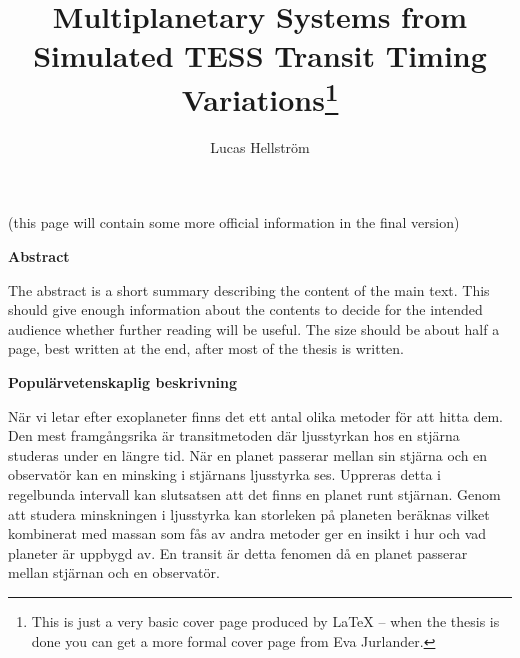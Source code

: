 \documentclass[12pt]{report}
\begin{document}
\title{\huge \bf Multiplanetary Systems from Simulated TESS Transit Timing Variations\footnote{This is just a very basic cover page produced by LaTeX -- when
the thesis is done you can get a more formal cover page from Eva Jurlander.}}
\author{Lucas Hellström}

\thispagestyle{empty} %

\maketitle

\newpage

\thispagestyle{empty}

\begin{center}
  (this page will contain some more official information in the final version)
\end{center}

\newpage

\thispagestyle{empty}

\begin{center}
  {\bf Abstract}
\end{center}
The abstract is a short summary describing the content of the main text. This
should give enough information about the contents to decide for the intended
audience whether further reading will be useful. The size should be about half
a page, best written at the end, after most of the thesis is written.

\newpage

\thispagestyle{empty}
\mbox{} %

\newpage

\thispagestyle{empty}

\begin{center}
  {\bf Popul\"arvetenskaplig beskrivning}
\end{center}
	När vi letar efter exoplaneter finns det ett antal olika metoder för att hitta dem. Den mest framgångsrika är transitmetoden där ljusstyrkan hos en stjärna studeras under en längre tid. När en planet passerar mellan sin stjärna och en observatör kan en minsking i stjärnans ljusstyrka ses. Uppreras detta i regelbunda intervall kan slutsatsen att det finns en planet runt stjärnan. Genom att studera minskningen i ljusstyrka kan storleken på planeten beräknas vilket kombinerat med massan som fås av andra metoder ger en insikt i hur och vad planeter är uppbygd av. En transit är detta fenomen då en planet passerar mellan stjärnan och en observatör.
	
\end{document}
